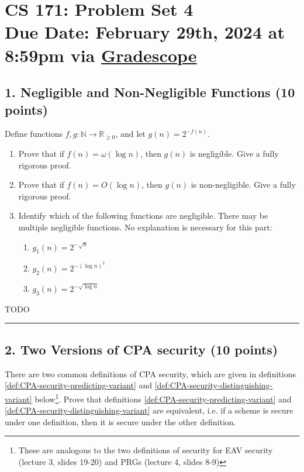 \documentclass[11pt]{article}
\numberwithin{equation}{section}
\newcommand{\qed}{\hspace*{\fill}\rule{7pt}{7pt}}
\newenvironment{solution}{\noindent{\bf Solution}\hspace*{1em}}{\qed\medskip}
\newcommand{\duedate}{February 29th, 2024 at 8:59pm via \href{https://www.gradescope.com/courses/689970}{Gradescope}}
\begin{document}
\section*{CS 171: Problem Set 4\\ {\small Due Date: \duedate} }

\subsection*{1. Negligible and Non-Negligible Functions (10 points)}
Define functions $f,g: \mathbb{N} \to \mathbb{R}_{\geq 0}$, and let $g(n) = 2^{-f(n)}$.

\begin{enumerate}
    \item Prove that if $f(n) = \omega(\log n)$, then $g(n)$ is negligible. Give a fully rigorous proof.
    \item Prove that if $f(n) = O(\log n)$, then $g(n)$ is non-negligible. Give a fully rigorous proof.
    \item Identify which of the following functions are negligible. There may be multiple negligible functions. No explanation is necessary for this part:
    \begin{enumerate}
        \item $g_1(n) = 2^{-\sqrt{n}}$
        \item $g_2(n) = 2^{-(\log n)^{2}}$
        \item $g_3(n) = 2^{-\sqrt{\log n}}$
    \end{enumerate}
\end{enumerate}

\begin{solution}
    TODO
\end{solution}
\pagebreak

\subsection*{2. Two Versions of CPA security (10 points)}
There are two common definitions of CPA security, which are given in definitions \ref{def:CPA-security-predicting-variant} and \ref{def:CPA-security-distinguishing-variant} below\footnote{These are analogous to the two definitions of security for EAV security (lecture 3, slides 19-20) and PRGs (lecture 4, slides 8-9)}. Prove that definitions \ref{def:CPA-security-predicting-variant} and \ref{def:CPA-security-distinguishing-variant} are equivalent, i.e. if a scheme is secure under one definition, then it is secure under the other definition. 
\end{document}
